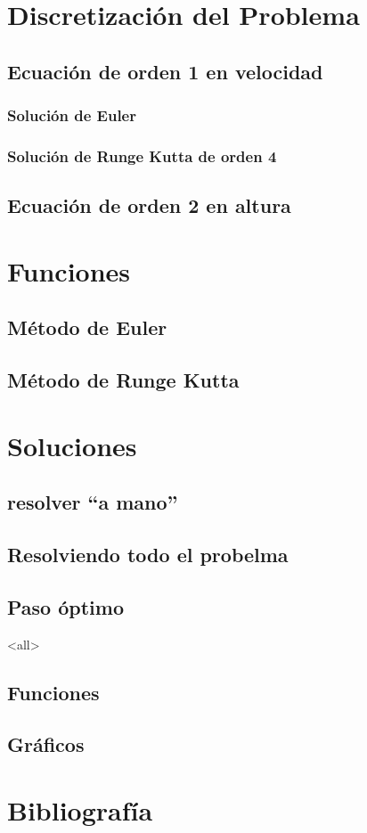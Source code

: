 \section{Discretización del Problema}
\subsection{Ecuación de orden 1 en velocidad}
\subsubsection{Solución de Euler}
\subsubsection{Solución de Runge Kutta de orden 4}
\subsection{Ecuación de orden 2 en altura}

\section{Funciones}
\subsection{Método de Euler}
\subsection{Método de Runge Kutta}
\section{Soluciones}
\subsection{resolver ``a mano''}
\subsection{Resolviendo todo el probelma}
\subsection{Paso óptimo}






\mode<all>




\subsection{Funciones}

\subsection{Gráficos}

\section{Bibliografía}


